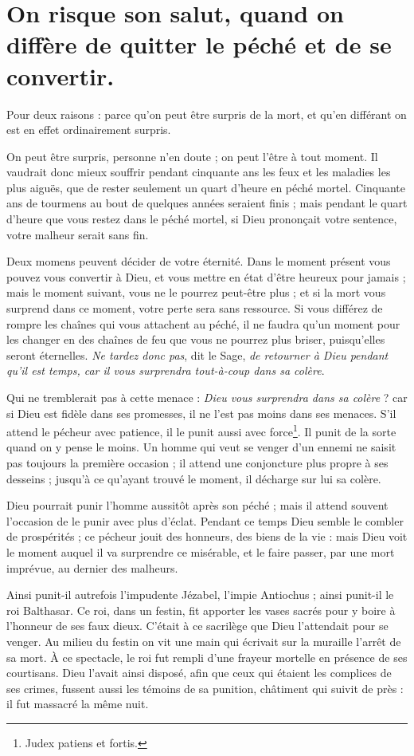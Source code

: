 \documentclass[instructions.tex]{subfiles}
\begin{document}
\chapter{On risque son salut, quand on diffère de quitter le péché et de se convertir.}


Pour deux raisons : parce qu'on peut être surpris de la mort, et qu'en différant on est en effet ordinairement surpris.

\primo On peut être surpris, personne n'en doute ; on peut l'être à tout moment. Il vaudrait donc mieux souffrir pendant cinquante ans les feux et les maladies les plus aiguës, que de rester seulement un quart d'heure en péché mortel. Cinquante ans de tourmens au bout de quelques années seraient finis ; mais pendant le quart d'heure que vous restez dans le péché mortel, si Dieu prononçait votre sentence, votre malheur serait sans fin.

Deux momens peuvent décider de votre éternité. Dans le moment présent vous pouvez vous convertir à Dieu, et vous mettre en état d'être heureux pour jamais ; mais le moment suivant, vous ne le pourrez peut-être plus ; et si la mort vous surprend dans ce moment, votre perte sera sans ressource. Si vous différez de rompre les chaînes qui vous attachent au péché, il ne faudra qu'un moment pour les changer en des chaînes de feu que vous ne pourrez plus briser, puisqu'elles seront éternelles. \emph{Ne tardez donc pas}, dit le Sage, \emph{de retourner à Dieu pendant qu'il est temps, car il vous surprendra tout-à-coup dans sa colère}.

\secundo Qui ne tremblerait pas à cette menace : \emph{Dieu vous surprendra dans sa colère} ? car si Dieu est fidèle dans ses promesses, il ne l'est pas moins dans ses menaces. S'il attend le pécheur avec patience, il le punit aussi avec force\footnote{Judex patiens et fortis.}. Il punit de la sorte quand on y pense le moins. Un homme qui veut se venger d'un ennemi ne saisit pas toujours la première occasion ; il attend une conjoncture plus propre à ses desseins ; jusqu'à ce qu'ayant trouvé le moment, il décharge sur lui sa colère.

Dieu pourrait punir l'homme aussitôt après son péché ; mais il attend souvent l'occasion de le punir avec plus d'éclat. Pendant ce temps Dieu semble le combler de prospérités ; ce pécheur jouit des honneurs, des biens de la vie : mais Dieu voit le moment auquel il va surprendre ce misérable, et le faire passer, par une mort imprévue, au dernier des malheurs.

Ainsi punit-il autrefois l'impudente Jézabel, l'impie Antiochus ; ainsi punit-il le roi Balthasar. Ce roi, dans un festin, fit apporter les vases sacrés pour y boire à l'honneur de ses faux dieux. C'était à ce sacrilège que Dieu l'attendait pour se venger. Au milieu du festin on vit une main qui écrivait sur la muraille l'arrêt de sa mort. À ce spectacle, le roi fut rempli d'une frayeur mortelle en présence de ses courtisans. Dieu l'avait ainsi disposé, afin que ceux qui étaient les complices de ses crimes, fussent aussi les témoins de sa punition, châtiment qui suivit de près : il fut massacré la même nuit.
\end{document}
